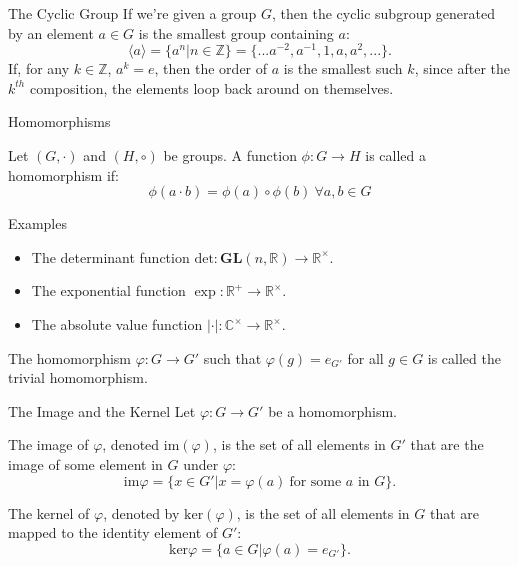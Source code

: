 \documentclass{beamer}
\begin{document}
\begin{frame}{The Cyclic Group}
  If we're given a group $G$, then the cyclic subgroup generated by an element $a \in G$ is the smallest group containing $a$:
  \[ 
    \langle a \rangle = \{a^n | n \in \mathbb{Z}\} = \{... a^{-2}, a^{-1}, 1, a, a^2, ...\}
  .\]
  If, for any $k \in \mathbb{Z}$, $a^k = e$, then the order of $a$ is the smallest such $k$, since after the $k^{th}$ composition, the elements loop back around on themselves.
\end{frame}
\begin{frame}{Homomorphisms}
  \begin{definition}[Homomorphism]
    Let $(G, \cdot)$ and $(H, \circ)$ be groups. A function $\phi: G \to H$ is called a homomorphism if:
    \[
    \phi(a \cdot b) = \phi(a) \circ \phi(b) ~\forall a, b \in G
    \]
  \end{definition}
\end{frame}
\begin{frame}{Examples}
  \begin{itemize}
  \item The determinant function $\text{det}: \mathbf{GL}(n, \mathbb{R}) \to \mathbb{R}^\times$.
  \item The exponential function $\exp: \mathbb{R}^+ \to \mathbb{R}^\times$.
  \item The absolute value function $|\cdot|: \mathbb{C}^\times \to \mathbb{R}^\times$.
  \end{itemize}
  \begin{definition}
    The homomorphism $\varphi: G \to G'$ such that $\varphi(g) = e_{G'}$ for all $g \in G$ is called the trivial homomorphism.
  \end{definition}
\end{frame}
\begin{frame}{The Image and the Kernel}
  Let $\varphi: G \to G'$  be a homomorphism. 
  \begin{definition}
  The image of $\varphi$, denoted $\text{im}(\varphi)$, is the set of all elements in $G'$ that are the image of some element in $G$ under $\varphi$:
  \[ 
    \text{im}\varphi = \{x \in G' | x = \varphi(a) ~\text{for some } a \text{ in } G\}
  .\]
  \end{definition} 
  \begin{definition}
    The kernel of $\varphi$, denoted by $\text{ker}(\varphi)$, is the set of all elements in $G$ that are mapped to the identity element of $G'$:
    \[ 
    \text{ker}\varphi = \{a \in G | \varphi(a) = e_{G'}\}
    .\]
    
  \end{definition}
\end{frame}
\end{document}
